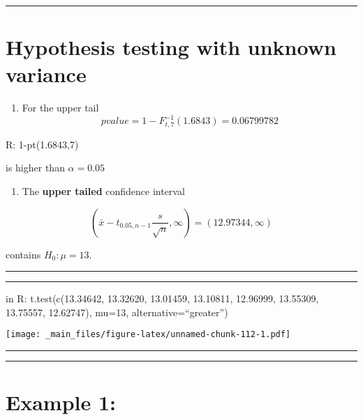 \documentclass[
]{book}
\providecommand{\tightlist}{%
  \setlength{\itemsep}{0pt}\setlength{\parskip}{0pt}}
\begin{document}
\begin{center}\rule{0.5\linewidth}{0.5pt}\end{center}

\hypertarget{hypothesis-testing-with-unknown-variance-2}{%
\section{Hypothesis testing with unknown variance}\label{hypothesis-testing-with-unknown-variance-2}}

\begin{enumerate}
\def\labelenumi{\arabic{enumi}.}
\setcounter{enumi}{1}
\tightlist
\item
  For the upper tail \[pvalue=1-F^{-1}_{t,7}(1.6843)=0.06799782\]
\end{enumerate}

R: 1-pt(1.6843,7)

is higher than \(\alpha=0.05\)

\begin{enumerate}
\def\labelenumi{\arabic{enumi}.}
\setcounter{enumi}{2}
\tightlist
\item
  The \textbf{upper tailed} confidence interval
\end{enumerate}

\[(\bar{x}-t_{0.05, n-1} \frac{s}{\sqrt{n}}, \infty)=(12.97344, \infty)\]

contains \(H_0:\mu=13\).

\begin{center}\rule{0.5\linewidth}{0.5pt}\end{center}

\begin{center}\rule{0.5\linewidth}{0.5pt}\end{center}

in R:
t.test(c(13.34642, 13.32620, 13.01459, 13.10811,
12.96999, 13.55309, 13.75557, 12.62747), mu=13, alternative=``greater'')

\texttt{[image: \_main\_files/figure-latex/unnamed-chunk-112-1.pdf]}

\begin{center}\rule{0.5\linewidth}{0.5pt}\end{center}

\begin{center}\rule{0.5\linewidth}{0.5pt}\end{center}

\hypertarget{example-1-4}{%
\section{Example 1:}\label{example-1-4}}
\end{document}

